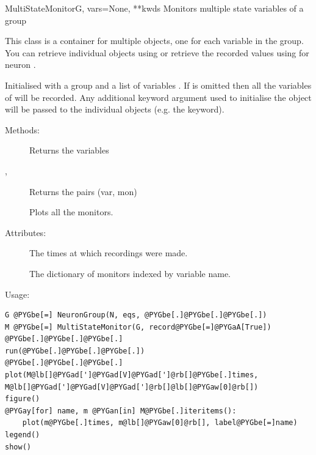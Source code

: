 \documentclass[letterpaper,10pt,english]{manual}
\begin{document}
\hypertarget{brian.MultiStateMonitor}{}\begin{classdesc}{MultiStateMonitor}{G, vars=None, **kwds}
Monitors multiple state variables of a group

This class is a container for multiple \hyperlink{brian.StateMonitor}{} objects,
one for each variable in the group. You can retrieve individual
\hyperlink{brian.StateMonitor}{} objects using  or retrieve the
recorded values using  for neuron .

Initialised with a group  and a list of variables . If 
 is omitted then all the variables of  will be recorded.
Any additional keyword argument used to initialise the object will
be passed to the individual \hyperlink{brian.StateMonitor}{} objects (e.g. the
 keyword).

Methods:
\begin{description}
\item[]
Returns the variables

\item[, ]
Returns the pairs (var, mon)

\item[]
Plots all the monitors.

\end{description}

Attributes:
\begin{description}
\item[]
The times at which recordings were made.

\item[]
The dictionary of monitors indexed by variable name.

\end{description}

Usage:

\begin{Verbatim}[commandchars=@\[\]]
G @PYGbe[=] NeuronGroup(N, eqs, @PYGbe[.]@PYGbe[.]@PYGbe[.])
M @PYGbe[=] MultiStateMonitor(G, record@PYGbe[=]@PYGaA[True])
@PYGbe[.]@PYGbe[.]@PYGbe[.]
run(@PYGbe[.]@PYGbe[.]@PYGbe[.])
@PYGbe[.]@PYGbe[.]@PYGbe[.]
plot(M@lb[]@PYGad[']@PYGad[V]@PYGad[']@rb[]@PYGbe[.]times, M@lb[]@PYGad[']@PYGad[V]@PYGad[']@rb[]@lb[]@PYGaw[0]@rb[])
figure()
@PYGay[for] name, m @PYGan[in] M@PYGbe[.]iteritems():
    plot(m@PYGbe[.]times, m@lb[]@PYGaw[0]@rb[], label@PYGbe[=]name)
legend()
show()
\end{Verbatim}
\end{classdesc}
\end{document}
